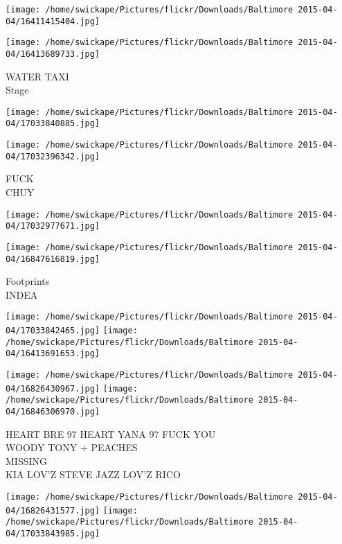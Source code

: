 \documentclass[10pt,letterpaper]{article}
\begin{document}
\texttt{[image: /home/swickape/Pictures/flickr/Downloads/Baltimore 2015-04-04/16411415404.jpg]}

\vspace{0.25in}
\texttt{[image: /home/swickape/Pictures/flickr/Downloads/Baltimore 2015-04-04/16413689733.jpg]}

WATER TAXI\\
Stage\\
\pagebreak

\texttt{[image: /home/swickape/Pictures/flickr/Downloads/Baltimore 2015-04-04/17033840885.jpg]}

\vspace{0.25in}
\texttt{[image: /home/swickape/Pictures/flickr/Downloads/Baltimore 2015-04-04/17032396342.jpg]}

FUCK\\
CHUY\\
\pagebreak

\texttt{[image: /home/swickape/Pictures/flickr/Downloads/Baltimore 2015-04-04/17032977671.jpg]}

\vspace{0.25in}
\texttt{[image: /home/swickape/Pictures/flickr/Downloads/Baltimore 2015-04-04/16847616819.jpg]}

Footprints\\
INDEA\\
\pagebreak

\texttt{[image: /home/swickape/Pictures/flickr/Downloads/Baltimore 2015-04-04/17033842465.jpg]}
\texttt{[image: /home/swickape/Pictures/flickr/Downloads/Baltimore 2015-04-04/16413691653.jpg]}

\texttt{[image: /home/swickape/Pictures/flickr/Downloads/Baltimore 2015-04-04/16826430967.jpg]}
\texttt{[image: /home/swickape/Pictures/flickr/Downloads/Baltimore 2015-04-04/16846306970.jpg]}

HEART BRE 97 HEART YANA 97 FUCK YOU\\
WOODY TONY + PEACHES\\
MISSING\\
KIA LOV'Z STEVE JAZZ LOV'Z RICO\\
\pagebreak

\texttt{[image: /home/swickape/Pictures/flickr/Downloads/Baltimore 2015-04-04/16826431577.jpg]}
\texttt{[image: /home/swickape/Pictures/flickr/Downloads/Baltimore 2015-04-04/17033843985.jpg]}
\end{document}
